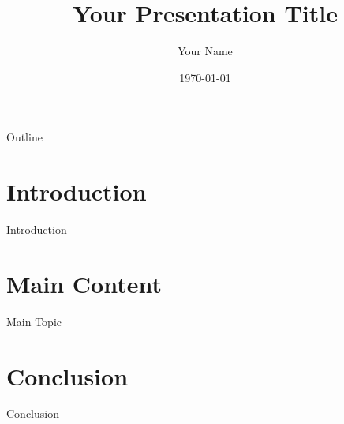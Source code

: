 \documentclass[aspectratio=169]{beamer}
\title{Your Presentation Title}
\author{Your Name}
\institute{Your Institute}
\date{\today}
\begin{document}
\begin{frame}
    \titlepage
\end{frame}

\begin{frame}{Outline}
    \tableofcontents
\end{frame}

\section{Introduction}
\begin{frame}{Introduction}
\end{frame}

\section{Main Content}
\begin{frame}{Main Topic}
\end{frame}

\section{Conclusion}
\begin{frame}{Conclusion}
\end{frame}
\end{document}
